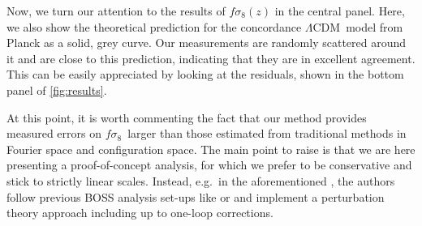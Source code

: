 \documentclass[astrosymb,twocolumn]{aastex631}
\renewcommand{\fs}{\ensuremath{f\!\sigma_8}}
\newcommand{\lcdm}{\(\Lambda\)CDM}
\begin{document}
Now, we turn our attention to the results of \(\fs(z)\) in the central panel. Here, we also show the theoretical prediction for the concordance \lcdm\ model from Planck as a solid, grey curve. Our measurements are randomly scattered around it and are close to this prediction, indicating that they are in excellent agreement. This can be easily appreciated by looking at the residuals, shown in the bottom panel of \autoref{fig:results}. %



At this point, it is worth commenting the fact that our method provides measured errors on \fs\ larger than those estimated from traditional methods in Fourier space and configuration space. The main point to raise is that we are here presenting a proof-of-concept analysis, for which we prefer to be conservative and stick to strictly linear scales. Instead, e.g.\ in the aforementioned \citet{Salazar2016}, the authors follow previous BOSS analysis set-ups like \citet{2017MNRAS.464.1640S} or \citet{2017MNRAS.467.2085G} and implement a perturbation theory approach including up to one-loop corrections.
\end{document}
